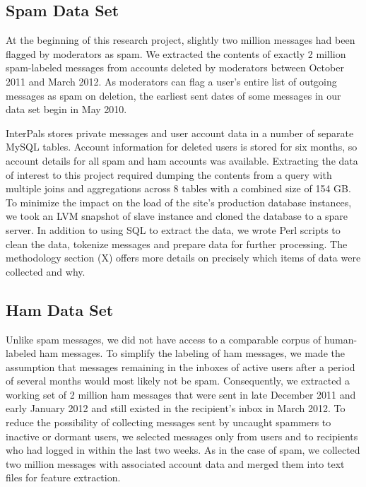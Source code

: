 \documentclass[preprint]{acm_proc_article-sp}
\begin{document}

\subsection{Spam Data Set}

At the beginning of this research project, slightly two million messages had 
been flagged by moderators as spam. We extracted the contents of exactly 2 million 
spam-labeled messages from accounts deleted by moderators between October 2011 
and March 2012. As moderators can flag a user's entire list of outgoing messages 
as spam on deletion, the earliest sent dates of some messages in our data set begin in 
May 2010. 

InterPals stores private messages and user account data in a number of separate MySQL tables. 
Account information for deleted users is stored for six months, so account details for all spam 
and ham accounts was available. Extracting the data of interest to this project required 
dumping the contents from a query with multiple joins and aggregations across 8 tables with a 
combined size of 154 GB. To minimize the impact on the load of the site's production database 
instances, we took an LVM snapshot of slave instance and cloned the database to a spare server. 
In addition to using SQL to extract the data, we wrote Perl scripts to clean the data, tokenize 
messages and prepare data for further processing. The methodology section (X) offers more details 
on precisely which items of data were collected and why.

\subsection{Ham Data Set}

Unlike spam messages, we did not have access to a comparable corpus of human-labeled ham 
messages. To simplify the labeling of ham messages, we made the assumption that messages remaining in 
the inboxes of active users after a period of several months would most likely not be spam. 
Consequently, we extracted a working set of 2 million ham messages that were sent in late December 2011 and early 
January 2012 and still existed in the recipient's inbox in March 2012. To reduce the 
possibility of collecting messages sent by uncaught spammers to inactive or dormant users, 
we selected messages only from users and to recipients who had logged in within the last two 
weeks. As in the case of spam, we collected two million messages with associated account 
data and merged them into text files for feature extraction.
\end{document}
